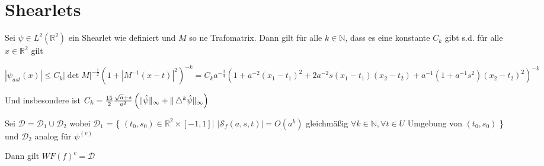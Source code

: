\section{Shearlets} %
\label{sec:shearlets}


\begin{proposition}
\label{prop:shearlets_decay_rapidly}
Sei $\psi \in L^2(\mathbb{R}^2)$ ein Shearlet wie definiert und $M$ so ne Trafomatrix. Dann gilt für alle $k \in  \mathbb{N}$, dass es eine konstante $C_k$ gibt s.d. für alle $x \in \mathbb{R}^2$ gilt

\begin{dmath*}
    \left| \psi_{ast}(x) \right|
    \leq
    C_k \left| \det M \right|^{-\frac{1}{2}}\left(1+|M^{-1}(x-t)|^2\right)^{-k}
    = C_k a^{-\frac{3}{4}}\left(1+a^{-2}\left(x_1-t_1\right)^2
        + 2 a^{-2}s\left(x_1-t_1\right)\left(x_2-t_2\right)
        + a^{-1}\left(1+a^{-1}s^2\right)\left(x_2-t_2\right)^2
    \right)^{-k}
\end{dmath*}

Und insbesondere ist $C_k = \frac{15}{2}\frac{\sqrt{a} + s}{a^2}\left(\Vert \hat\psi \Vert_\infty + \Vert \mathop{}\!\mathbin\bigtriangleup^k \hat\psi \Vert_\infty\right)$

\end{proposition}

\begin{theorem}
\label{thm:main_theorem}
    Sei $\mathcal{D} = \mathcal{D}_1 \cup \mathcal{D}_2$ wobei
    $\mathcal{D}_1$ = \{
        $(t_0, s_0) \in \mathbb{R}^2 \times [-1,1] \big|$
        $|\mathcal{S}_f (a, s, t)| = O(a^k)$ gleichmäßig $\forall k \in \mathbb{N}
        , \forall t \in U$ Umgebung von $(t_0, s_0)$
    \}
    und $\mathcal{D}_2$ analog für $\psi^{(v)}$

    Dann gilt $WF(f)^c = \mathcal{D}$
\end{theorem}


